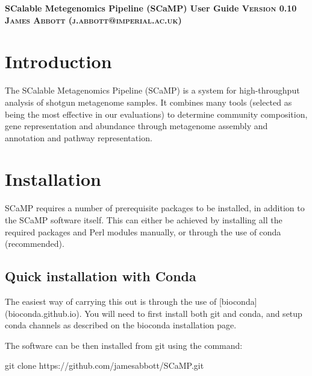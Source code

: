 \documentclass[a4paper,10pt]{article}
\begin{document}
\begin{titlepage}
\begin{center}
  \bfseries
  \huge SCalable Metegenomics Pipeline (SCaMP) User Guide
  \vskip 0.1in
  \textsc{\normalsize Version 0.10 }
  \vskip 0.1in
  \textsc{\normalsize James Abbott (j.abbott@imperial.ac.uk)}
\end{center}

\tableofcontents
\renewcommand{\baselinestretch}{1.0}\normalsize
\end{titlepage}
\newpage
\graphicspath{ {images/} }

\section{Introduction}

The SCalable Metagenomics Pipeline (SCaMP) is a system for high-throughput
analysis of shotgun metagenome samples. It combines many tools (selected as
being the most effective in our evaluations) to determine community
composition, gene representation and abundance through metagenome assembly and
annotation and pathway representation. 

\section{Installation}

SCaMP requires a number of prerequisite packages to be installed, in addition                            
to the SCaMP software itself. This can either be achieved by installing all the
required packages and Perl modules manually, or through the use of conda
(recommended).


\subsection{Quick installation with Conda}

The easiest way of carrying this out is through                            
the use of [bioconda](bioconda.github.io). You will need to first install both                           
git and conda, and setup conda channels as described on the bioconda                                     
installation page.                                  

The software can be then installed from git using the command:                                           

git clone https://github.com/jamesabbott/SCaMP.git  
\end{document}
